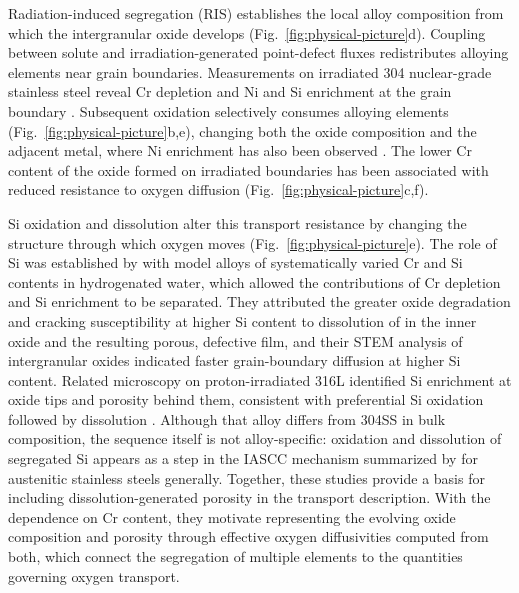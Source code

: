 \documentclass[3p,times,nonatbib]{elsarticle} %
\begin{document}
Radiation-induced segregation (RIS) establishes the local alloy
composition from which the intergranular oxide develops
(Fig.~\ref{fig:physical-picture}d). Coupling between
solute and irradiation-generated point-defect fluxes redistributes
alloying elements near grain boundaries. Measurements on irradiated
304 nuclear-grade stainless steel reveal Cr depletion and Ni and Si enrichment
at the grain boundary \cite{deng2021grain}. Subsequent
oxidation selectively consumes alloying elements
(Fig.~\ref{fig:physical-picture}b,e), changing both the oxide
composition and the adjacent metal, where Ni enrichment has also been
observed \cite{deng2021grain}. The lower Cr content of the oxide
formed on irradiated boundaries has been associated with reduced
resistance to oxygen diffusion \cite{deng2017effect}
(Fig.~\ref{fig:physical-picture}c,f).

Si oxidation and dissolution alter this transport resistance by changing
the structure through which oxygen moves
(Fig.~\ref{fig:physical-picture}e). The role of Si was established by
\textcite{du2026silicon} with model alloys of systematically varied Cr and
Si contents in hydrogenated water, which allowed the contributions of Cr
depletion and Si enrichment to be separated. They
attributed the greater oxide degradation and cracking susceptibility at
higher Si content to dissolution of  in the inner oxide and the
resulting porous, defective film, and their STEM analysis of intergranular
oxides indicated faster grain-boundary diffusion at higher Si content. Related microscopy on
proton-irradiated 316L identified Si enrichment at oxide tips and
porosity behind them, consistent with preferential Si oxidation followed
by dissolution \cite{kuang2022highresolution}. Although that alloy
differs from 304SS in bulk composition, the sequence itself is not
alloy-specific: oxidation and dissolution of segregated Si appears as a
step in the IASCC mechanism summarized by \textcite{was2024how} for
austenitic stainless steels generally. Together, these studies provide
a basis for including dissolution-generated porosity in the transport
description. With the dependence on Cr content, they motivate
representing the evolving oxide composition and porosity through
effective oxygen diffusivities computed from both, which connect the
segregation of multiple elements to the quantities governing oxygen
transport.
\end{document}
